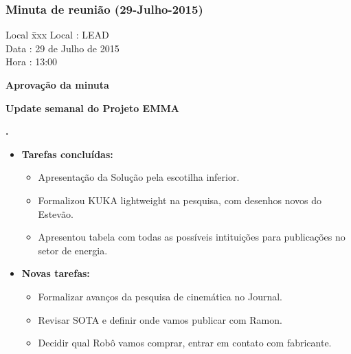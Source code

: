 \subsubsection{Minuta de reunião (29-Julho-2015)}

\begin{tabbing}
  Local \= xxx \kill
  Local \> : LEAD \\
  Data  \> : 29 de Julho de 2015 \\
  Hora  \> : 13:00
\end{tabbing}


\textbf{Aprovação da minuta}

\textbf{Update semanal do Projeto EMMA}

  
\textbf{\renan.} 
	\begin{itemize}
		\item \textbf{Tarefas concluídas:}
			\begin{itemize}    
				\item Apresentação da Solução pela escotilha inferior.
 				\item Formalizou KUKA lightweight na pesquisa, com desenhos novos do
 				Estevão.
 				\item Apresentou tabela com todas as possíveis intituições para
 				publicações no setor de energia.
			\end{itemize}
		
		\item \textbf{Novas tarefas:}
			\begin{itemize} 
				\item Formalizar avanços da pesquisa de cinemática no Journal.
				\item Revisar SOTA e definir onde vamos publicar com Ramon.
				\item Decidir qual Robô vamos comprar, entrar em contato com fabricante.
			\end{itemize}
	\end{itemize}

